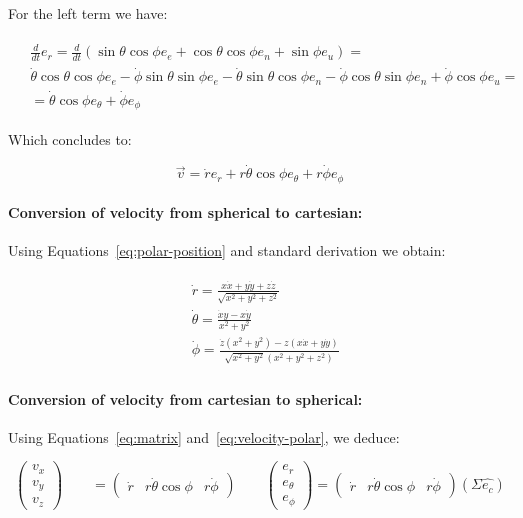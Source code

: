 \documentclass{article}
\newcommand{\east}{e_e}
\newcommand{\north}{e_n}
\newcommand{\up}{e_u}
\newcommand{\range}{e_r}
\newcommand{\bearing}{e_\theta}
\newcommand{\elevation}{e_\phi}
\newcommand{\rrate}{\dot{r}}
\newcommand{\brate}{\dot{\theta}}
\newcommand{\erate}{\dot{\phi}}
\newcommand{\carvec}{\hat{e_{c}}}
\begin{document}
For the left term we have:

\begin{align*}
\begin{split}
& \frac{d}{dt} \range = \frac{d}{dt}(\sin \theta \cos \phi \east + \cos \theta
\cos \phi \north + \sin \phi \up ) =  \\ 
& \brate \cos \theta \cos \phi \east -
\erate \sin \theta \sin \phi \east - \brate \sin \theta \cos \phi \north - \erate \cos
\theta \sin \phi \north + \erate \cos \phi \up = \\
& = \brate \cos \phi \bearing + \erate \elevation 
\end{split}
\end{align*}


Which concludes to:

\begin{equation}\label{eq:velocity-polar}
\vec{v} = \rrate \range + r \brate \cos \phi \bearing + r \erate \elevation 
\end{equation}

\paragraph{Conversion of velocity from spherical to cartesian:}
Using Equations~\ref{eq:polar-position} and standard derivation we obtain:

\begin{align}
\begin{split}
{}& \rrate= \frac{x\dot{x}+y\dot{y}+z\dot{z}}{\sqrt{x^2 + y^2 + z^2}} \\
{}& \brate= \frac{\dot{x}y-x\dot{y}}{x^2+y^2}
\\
{}& \erate = \frac{\dot{z}(x^2+y^2) - z(x\dot{x}+y\dot{y})}{\sqrt{x^2+y^2}(x^2 +
y^2 + z^2)}
\end{split}
\end{align}

\paragraph{Conversion of velocity from cartesian to spherical:}
Using Equations~\ref{eq:matrix} and~\ref{eq:velocity-polar}, we deduce:


\begin{equation}\label{eq:car-polar}
\begin{pmatrix}
    v_x \\
   v_y \\
    v_z
  \end{pmatrix}
  \qquad
  = \begin{pmatrix}
    \rrate & r\brate \cos \phi & r\erate
  \end{pmatrix}
  \qquad
  \begin{pmatrix}
    \range \\
   \bearing \\
    \elevation
  \end{pmatrix}
  = \begin{pmatrix}
    \rrate & r\brate \cos \phi & r\erate
  \end{pmatrix} (\Sigma \carvec)
\end{equation}
\end{document}
